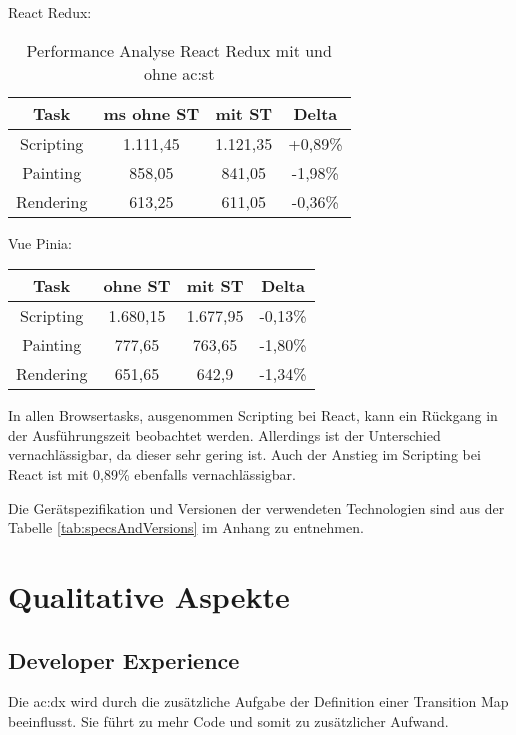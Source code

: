 React Redux:

\begin{table}[h!]
  \caption{Performance Analyse React Redux mit und ohne \acrshort{ac:st}}
  \label{tab:performanceAnalysisReactSTvsNoST}

  \begin{center}
    \begin{tabular}{|c|c|c|c|} 
    \hline
    Task & ms ohne ST & mit ST & Delta \\ [0.5ex]
    \hline\hline
    Scripting & 1.111,45 & 1.121,35 & +0,89\% \\
    \hline
    Painting & 858,05 & 841,05 & -1,98\% \\
    \hline
    Rendering & 613,25 & 611,05 & -0,36\% \\
    \hline
    \end{tabular}
  \end{center}
\end{table}

Vue Pinia:

\begin{center}
  \begin{tabular}{|c|c|c|c|} 
   \hline
   Task & ohne ST & mit ST & Delta \\ [0.5ex]
   \hline\hline
   Scripting & 1.680,15 & 1.677,95 & -0,13\% \\
   \hline
   Painting & 777,65 & 763,65 & -1,80\% \\
   \hline
   Rendering & 651,65 & 642,9 & -1,34\% \\
   \hline
  \end{tabular}
\end{center}

In allen Browsertasks, ausgenommen Scripting bei React, kann ein Rückgang in der Ausführungszeit beobachtet werden. Allerdings ist der Unterschied vernachlässigbar, da dieser sehr gering ist. Auch der Anstieg im Scripting bei React ist mit 0,89\% ebenfalls vernachlässigbar.

Die Gerätspezifikation und Versionen der verwendeten Technologien sind aus der Tabelle \ref{tab:specsAndVersions} im Anhang zu entnehmen.

\section{Qualitative Aspekte}

\subsection{Developer Experience}
Die \acrshort{ac:dx} wird durch die zusätzliche Aufgabe der Definition einer Transition Map beeinflusst. Sie führt zu mehr Code und somit zu zusätzlicher Aufwand.

